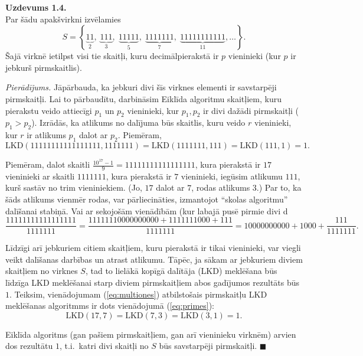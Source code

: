 \documentclass[a4paper,12pt]{article}
\begin{document}
\newpage
{\bf Uzdevums 1.4.}\\
Par šādu apakšvirkni izvēlamies 
$$S = \left\{ \underbrace{11}_2,\;\underbrace{111}_3,\; \underbrace{11111}_5,\; \underbrace{1111111}_7,\; \underbrace{11111111111}_{11},\ldots \right\}.$$
Šajā virknē ietilpst visi tie skaitļi, kuru decimālpierakstā ir $p$ vieninieki (kur $p$ ir jebkurš pirmskaitlis).

\vspace{5pt}
{\em Pierādījums.} Jāpārbauda, ka jebkuri divi šīs virknes elementi ir savstarpēji pirmskaitļi. 
Lai to pārbaudītu, darbināsim Eiklīda algoritmu skaitļiem, kuru pierakstu veido attiecīgi $p_1$ un $p_2$ vieninieki, 
kur $p_1, p_2$ ir divi dažādi pirmskaitļi ($p_1 > p_2$). Izrādās, ka atlikums no dalījuma būs skaitlis, kuru veido 
$r$ vieninieki, kur $r$ ir atlikums $p_1$ dalot ar $p_2$. Piemēram,
\begin{equation}
\label{eq:multiones}
\mbox{LKD}\left(11111111111111111,1111111 \right) = \mbox{LKD}\left( 1111111, 111 \right) = \mbox{LKD}(111,1) =1.
\end{equation}

Piemēram, dalot skaitli ${\displaystyle \frac{10^{17}-1}{9}} = 11111111111111111$, kura pierakstā ir $17$ vieninieki 
ar skaitli $1111111$, kura pierakstā ir $7$ vieninieki, iegūsim atlikumu $111$, kurš sastāv no trim vieniniekiem.
(Jo, $17$ dalot ar $7$, rodas atlikums $3$.) Par to, ka šāds atlikums vienmēr rodas, var pārliecināties, izmantojot 
``skolas  algoritmu'' dalīšanai stabiņā. Vai ar sekojošām vienādībām (kur labajā pusē pirmie divi d
$$\frac{11111111111111111}{1111111} = \frac{11111110000000000  + 1111111000 + 111}{1111111} = 10000000000 + 1000 + \frac{111}{1111111}.$$

Līdzīgi arī jebkuriem citiem  skaitļiem, kuru pierakstā ir tikai vieninieki, var viegli veikt dalīšanas darbības un atrast atlikumu.
Tāpēc, ja sākam ar jebkuriem diviem skaitļiem no virknes $S$, tad to lielākā kopīgā dalītāja (LKD) meklēšana
būs līdzīga LKD meklēšanai starp diviem pirmskaitļiem \textendash{} abos gadījumos rezultāts būs $1$. 
Teiksim, vienādojumam (\ref{eq:multiones}) atbilstošais pirmskaitļu LKD meklēšanas algoritmms ir dots vienādojumā (\ref{eq:primes}): 
\begin{equation}
\label{eq:primes}
\mbox{LKD}\left(17,7 \right) = \mbox{LKD}(7,3) = \mbox{LKD}(3,1) = 1.
\end{equation}

Eiklīda algoritms (gan pašiem pirmskaitļiem, gan arī vieninieku virknēm) arvien dos rezultātu $1$, t.i.\
katri divi skaitļi no $S$ būs savstarpēji pirmskaitļi. $\blacksquare$
\end{document}

